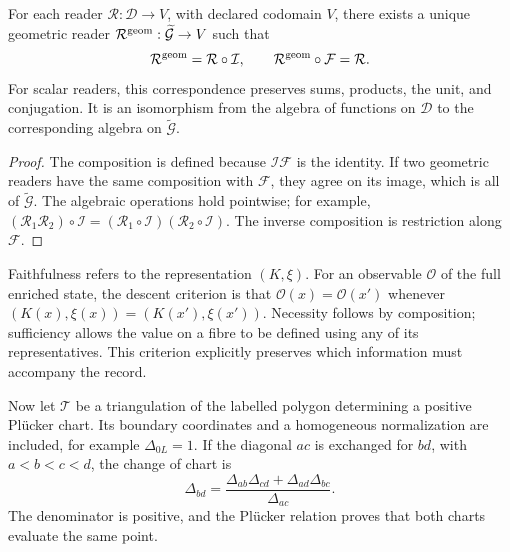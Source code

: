 \begin{theorem}
\label{thm:compat-algebra-lectores}
For each reader \(\mathcal R:\mathcal D\to V\), with declared
codomain \(V\), there exists a unique geometric reader
\(\mathcal R^{\rm geom}:\widetilde{\mathcal G}\to V\) such that
\[
 \mathcal R^{\rm geom}=\mathcal R\circ\mathcal I,
 \qquad \mathcal R^{\rm geom}\circ\mathcal F=\mathcal R.
\]
For scalar readers, this correspondence preserves sums, products,
the unit, and conjugation. It is an isomorphism from the algebra of functions on
\(\mathcal D\) to the corresponding algebra on
\(\widetilde{\mathcal G}\).
\end{theorem}
\begin{proof}
The composition is defined because \(\mathcal I\mathcal F\) is
the identity. If two geometric readers have the same composition
with \(\mathcal F\), they agree on its image, which is all of
\(\widetilde{\mathcal G}\). The algebraic operations hold
pointwise; for example,
\((\mathcal R_1\mathcal R_2)\circ\mathcal I=
(\mathcal R_1\circ\mathcal I)(\mathcal R_2\circ\mathcal I)\).
The inverse composition is restriction along \(\mathcal F\).
\end{proof}

Faithfulness refers to the representation \((K,\xi)\). For an
observable \(\mathcal O\) of the full enriched state, the descent
criterion is that \(\mathcal O(x)=\mathcal O(x')\) whenever
\((K(x),\xi(x))=(K(x'),\xi(x'))\). Necessity follows by
composition; sufficiency allows the value on a fibre to be defined
using any of its representatives. This criterion explicitly
preserves which information must accompany the record.

Now let \(\mathcal T\) be a triangulation of the labelled polygon
determining a positive Pl\"ucker chart. Its boundary coordinates
and a homogeneous normalization are included, for example
\(\Delta_{0L}=1\). If the diagonal \(ac\) is exchanged for
\(bd\), with \(a<b<c<d\), the change of chart is
\begin{equation}
 \Delta_{bd}=
 \frac{\Delta_{ab}\Delta_{cd}+\Delta_{ad}\Delta_{bc}}{\Delta_{ac}}.
 \label{eq:compat-cambio-carta}
\end{equation}
The denominator is positive, and the Pl\"ucker relation proves that both
charts evaluate the same point.

